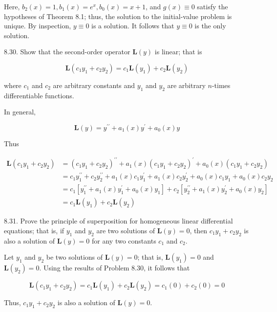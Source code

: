 \documentclass[10pt]{article}
\begin{document}
Here, $b_{2}(x)=1, b_{1}(x)=e^{x}, b_{0}(x)=x+1$, and $g(x) \equiv 0$ satisfy the hypotheses of Theorem 8.1; thus, the solution to the initial-value problem is unique. By inspection, $y \equiv 0$ is a solution. It follows that $y \equiv 0$ is the only solution.

8.30. Show that the second-order operator $\mathbf{L}(y)$ is linear; that is

$$
\mathbf{L}\left(c_{1} y_{1}+c_{2} y_{2}\right)=c_{1} \mathbf{L}\left(y_{1}\right)+c_{2} \mathbf{L}\left(y_{2}\right)
$$

where $c_{1}$ and $c_{2}$ are arbitrary constants and $y_{1}$ and $y_{2}$ are arbitrary $n$-times differentiable functions.

In general,

$$
\mathbf{L}(y)=y^{\prime \prime}+a_{1}(x) y^{\prime}+a_{0}(x) y
$$

Thus

$$
\begin{aligned}
\mathbf{L}\left(c_{1} y_{1}+c_{2} y_{2}\right) & =\left(c_{1} y_{1}+c_{2} y_{2}\right)^{\prime \prime}+a_{1}(x)\left(c_{1} y_{1}+c_{2} y_{2}\right)^{\prime}+a_{0}(x)\left(c_{1} y_{1}+c_{2} y_{2}\right) \\
& =c_{1} y_{1}^{\prime \prime}+c_{2} y_{2}^{\prime \prime}+a_{1}(x) c_{1} y_{1}^{\prime}+a_{1}(x) c_{2} y_{2}^{\prime}+a_{0}(x) c_{1} y_{1}+a_{0}(x) c_{2} y_{2} \\
& =c_{1}\left[y_{1}^{\prime \prime}+a_{1}(x) y_{1}^{\prime}+a_{0}(x) y_{1}\right]+c_{2}\left[y_{2}^{\prime \prime}+a_{1}(x) y_{2}^{\prime}+a_{0}(x) y_{2}\right] \\
& =c_{1} \mathbf{L}\left(y_{1}\right)+c_{2} \mathbf{L}\left(y_{2}\right)
\end{aligned}
$$

8.31. Prove the principle of superposition for homogeneous linear differential equations; that is, if $y_{1}$ and $y_{2}$ are two solutions of $\mathbf{L}(y)=0$, then $c_{1} y_{1}+c_{2} y_{2}$ is also a solution of $\mathbf{L}(y)=0$ for any two constants $c_{1}$ and $c_{2}$.

Let $y_{1}$ and $y_{2}$ be two solutions of $\mathbf{L}(y)=0$; that is, $\mathbf{L}\left(y_{1}\right)=0$ and $\mathbf{L}\left(y_{2}\right)=0$. Using the results of Problem 8.30, it follows that

$$
\mathbf{L}\left(c_{1} y_{1}+c_{2} y_{2}\right)=c_{1} \mathbf{L}\left(y_{1}\right)+c_{2} \mathbf{L}\left(y_{2}\right)=c_{1}(0)+c_{2}(0)=0
$$

Thus, $c_{1} y_{1}+c_{2} y_{2}$ is also a solution of $\mathbf{L}(y)=0$.
\end{document}
